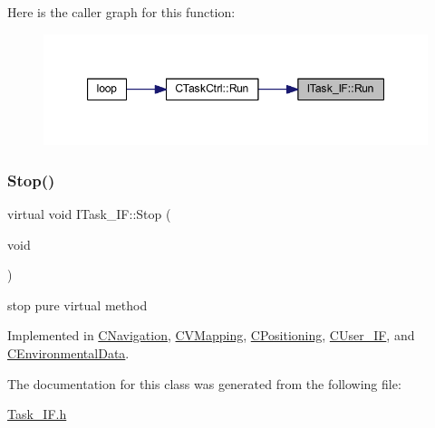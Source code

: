 Here is the caller graph for this function\+:\nopagebreak
\begin{figure}[H]
\begin{center}
\leavevmode
\includegraphics[width=347pt]{class_i_task___i_f_ab73cc5879a61d00fc59b72cce32cc6f7_icgraph}
\end{center}
\end{figure}
\mbox{\label{class_i_task___i_f_af5f8fba86704c7e36d0e4681d58300c6}} 
\subsubsection{\texorpdfstring{Stop()}{Stop()}}
{\footnotesize\ttfamily virtual void I\+Task\+\_\+\+I\+F\+::\+Stop (\begin{DoxyParamCaption}\item[{void}]{ }\end{DoxyParamCaption})\hspace{0.3cm}{\ttfamily [pure virtual]}}



stop pure virtual method 



Implemented in \mbox{\hyperlink{class_c_navigation_a3cc8f7fdd003d6b2c5056b87ff93edd9}{C\+Navigation}}, \mbox{\hyperlink{class_c_v_mapping_ad4e34f79b444109d0cbf1223881126dc}{C\+V\+Mapping}}, \mbox{\hyperlink{class_c_positioning_a2706c9bb6bb52201c279386fd2c9dd89}{C\+Positioning}}, \mbox{\hyperlink{class_c_user___i_f_ae241b3296f4dd7810897ed8631ede880}{C\+User\+\_\+\+IF}}, and \mbox{\hyperlink{class_c_environmental_data_a61a8f487f013602aab4dadcf8a9da4c8}{C\+Environmental\+Data}}.



The documentation for this class was generated from the following file\+:\begin{DoxyCompactItemize}
\item 
\mbox{\hyperlink{_task___i_f_8h}{Task\+\_\+\+I\+F.\+h}}\end{DoxyCompactItemize}
